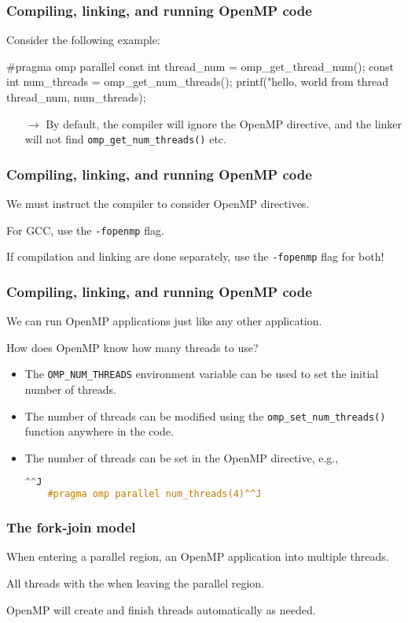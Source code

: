 \documentclass[12pt,t]{beamer}
\let\emph\relax %
\newcommand{\conclude}[1]{%
  \begin{itemize}
    \item[$\rightarrow$]#1
  \end{itemize}
}
\newcommand{\codeline}[2][]{%
  \begin{lstlisting}[language=c++,#1]^^J
    #2^^J
  \end{lstlisting}
}
\begin{document}
  \begin{frame}[fragile]
    \frametitle{Compiling, linking, and running OpenMP code}

    Consider the following example:
    \begin{code}
#pragma omp parallel
{
  const int thread_num = omp_get_thread_num();
  const int num_threads = omp_get_num_threads();
  printf("hello, world from thread %
         thread_num, num_threads);
}
    \end{code}

    \conclude{By default, the compiler will ignore the OpenMP directive, and the linker will not find \texttt{omp\_get\_num\_threads()} etc.}
  \end{frame}

  \begin{frame}[fragile]
    \frametitle{Compiling, linking, and running OpenMP code}

    We must instruct the compiler to consider OpenMP directives.

    For GCC, use the \texttt{-fopenmp} flag.

    If compilation and linking are done separately, use the \texttt{-fopenmp} flag for both!
  \end{frame}

  \begin{frame}[fragile]
    \frametitle{Compiling, linking, and running OpenMP code}

    We can run OpenMP applications just like any other application.

    How does OpenMP know how many threads to use?
    \begin{itemize}
      \item The \texttt{OMP\_NUM\_THREADS} environment variable can be used to set the initial number of threads.
      \item The number of threads can be modified using the \texttt{omp\_set\_num\_threads()} function anywhere in the code.
      \item The number of threads can be set in the OpenMP directive, e.g.,\codeline{#pragma omp parallel num_threads(4)}
    \end{itemize}
  \end{frame}

  \begin{frame}[fragile]
    \frametitle{The fork-join model}

    When entering a parallel region, an OpenMP application \emph{forks} into multiple threads.

    All threads \emph{join} with the \emph{master thread} when leaving the parallel region.

    OpenMP will create and finish threads automatically as needed.
  \end{frame}
\end{document}
